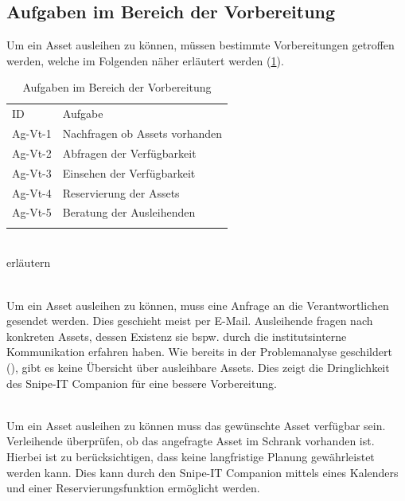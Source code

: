 \subsection{Aufgaben im Bereich der Vorbereitung}
Um ein Asset ausleihen zu können, müssen bestimmte Vorbereitungen getroffen werden, welche im
Folgenden näher erläutert werden (\ref{table:Ag-Vt}).

\begin{table}[h]
        \centering
        \caption{Aufgaben im Bereich der Vorbereitung}
        \begin{tabular}{ll}
                \arrayrulecolor{maincolor}\hline
                \sffamily\color{maincolor}ID & \sffamily\color{maincolor}Aufgabe \\
                \arrayrulecolor{maincolor}\hline
                Ag-Vt-1                      & Nachfragen ob Assets vorhanden    \\
                Ag-Vt-2                      & Abfragen der Verfügbarkeit        \\
                Ag-Vt-3                      & Einsehen der Verfügbarkeit        \\
                Ag-Vt-4                      & Reservierung der Assets           \\
                Ag-Vt-5                      & Beratung der Ausleihenden         \\
                \arrayrulecolor{maincolor}\hline
        \end{tabular}
        \label{table:Ag-Vt}
\end{table}
{\sffamily\color{maincolor}{Ag-Vt-1 |  Nachfragen ob Assets vorhanden}}\\
erläutern

{\sffamily\color{maincolor}{Ag-Vt-2 | Abfragen der Verfügbarkeit}}\\
Um ein Asset ausleihen zu können, muss eine Anfrage an die Verantwortlichen gesendet werden. Dies
geschieht meist per E-Mail. Ausleihende fragen nach konkreten Assets, dessen Existenz sie bspw.
durch die institutsinterne Kommunikation erfahren haben. Wie bereits in der Problemanalyse geschildert
(), gibt es keine Übersicht über ausleihbare Assets. Dies zeigt
die Dringlichkeit des Snipe-IT Companion für eine bessere Vorbereitung.

        {\sffamily\color{maincolor}{Ag-Vt-3 | Einsehen der Verfügbarkeit}}\\
Um ein Asset ausleihen zu können muss das gewünschte Asset verfügbar sein. Verleihende überprüfen,
ob das angefragte Asset im Schrank vorhanden ist. Hierbei ist zu berücksichtigen, dass keine
langfristige Planung gewährleistet werden kann. Dies kann durch den Snipe-IT Companion mittels eines
Kalenders und einer Reservierungsfunktion ermöglicht werden.

